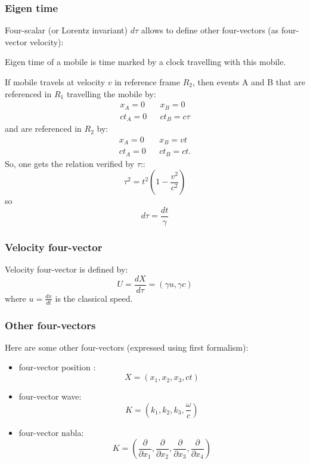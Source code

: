 \documentclass[12pt]{book}
\begin{document}
\subsubsection{Eigen time}
Four-scalar (or Lorentz invariant) $d\tau$ allows to define other
four-vectors (as four-vector velocity):
\begin{defn}
Eigen time of a mobile is time marked by a clock travelling with this mobile.
\end{defn}
If mobile travels at velocity $v$ in reference frame $R_2$, then events A and B
that are referenced in $R_1$ travelling the mobile by:
\begin{eqnarray}
x_A=0& &x_B=0\\
ct_A=0& &ct_B=c\tau
\end{eqnarray}
and are referenced in $R_2$ by:
\begin{eqnarray}
x_A=0& &x_B=vt\\
ct_A=0& &ct_B=ct.
\end{eqnarray}
So, one gets the relation verified by $\tau$::
\begin{equation}
\tau^2=t^2(1-\frac{v^2}{c^2})
\end{equation}
so
\begin{equation}
d\tau=\frac{dt}{\gamma}
\end{equation}

\subsubsection{Velocity four-vector}
Velocity four-vector is defined by:
\begin{equation}
U=\frac{dX}{d\tau}=(\gamma u,\gamma c)
\end{equation}
where $u=\frac{dx}{dt}$ is the classical speed.
\subsubsection{Other four-vectors}
Here are some other four-vectors (expressed using first formalism):
\begin{itemize}
\item four-vector position :
\begin{equation}
X=(x_1,x_2,x_3,ct)
\end{equation}
\item four-vector wave:
\begin{equation}
K=(k_1,k_2,k_3,\frac{\omega}{c})
\end{equation}
\item four-vector nabla:
\begin{equation}
K=(\frac{\partial}{\partial x_1},\frac{\partial}{\partial x_2},\frac{\partial}{\partial x_3},\frac{\partial}{\partial x_4})
\end{equation}
\end{itemize}
\end{document}

